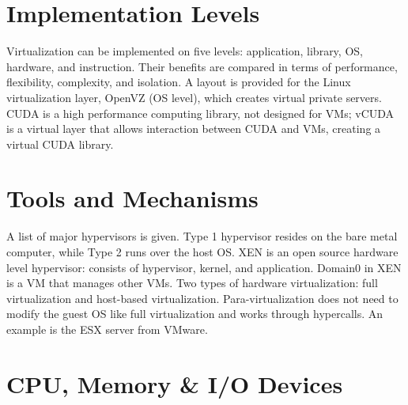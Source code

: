 
\section{Implementation Levels}

Virtualization can be implemented on five levels: application, library,
OS, hardware, and instruction. Their benefits are compared in terms of
performance, flexibility, complexity, and isolation. A layout is
provided for the Linux virtualization layer, OpenVZ (OS level), which
creates virtual private servers. CUDA is a high performance computing
library, not designed for VMs; vCUDA is a virtual layer that allows
interaction between CUDA and VMs, creating a virtual CUDA library.




\section{Tools and Mechanisms}

A list of major hypervisors is given. Type 1 hypervisor resides on the
bare metal computer, while Type 2 runs over the host OS. XEN is an open
source hardware level hypervisor: consists of hypervisor, kernel, and
application. Domain0 in XEN is a VM that manages other VMs. Two types of
hardware virtualization: full virtualization and host-based
virtualization. Para-virtualization does not need to modify the guest OS
like full virtualization and works through hypercalls. An example is the
ESX server from VMware.




\section{CPU, Memory \& I/O Devices}

